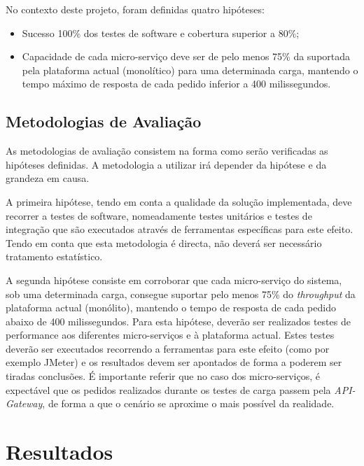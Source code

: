 No contexto deste projeto, foram definidas quatro hipóteses:
\begin{itemize}
    \item Sucesso 100\% dos testes de software e cobertura superior a 80\%;
    \item Capacidade de cada micro-serviço deve ser de pelo menos 75\% da suportada pela plataforma actual (monolítico) para uma determinada carga, mantendo o tempo máximo de resposta de cada pedido inferior a 400 milissegundos.
\end{itemize}

\subsection{Metodologias de Avaliação}
As metodologias de avaliação consistem na forma como serão verificadas as hipóteses definidas. A metodologia a utilizar irá depender da hipótese e da grandeza em causa.

A primeira hipótese, tendo em conta a qualidade da solução implementada, deve recorrer a testes de software, nomeadamente testes unitários e testes de integração que são executados através de ferramentas específicas para este efeito. Tendo em conta que esta metodologia é directa, não deverá ser necessário tratamento estatístico.

A segunda hipótese consiste em corroborar que cada micro-serviço do sistema, sob uma determinada carga, consegue suportar pelo menos 75\% do \emph{throughput} da plataforma actual (monólito), mantendo o tempo de resposta de cada pedido abaixo de 400 milissegundos. Para esta hipótese, deverão ser realizados testes de performance aos diferentes micro-serviços e à plataforma actual. Estes testes deverão ser executados recorrendo a ferramentas para este efeito (como por exemplo JMeter) e os resultados devem ser apontados de forma a poderem ser tiradas conclusões. É importante referir que no caso dos micro-serviços, é expectável que os pedidos realizados durante os testes de carga passem pela \emph{API-Gateway}, de forma a que o cenário se aproxime o mais possível da realidade.

\section{Resultados}